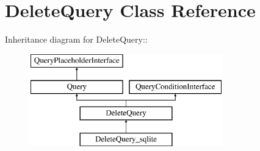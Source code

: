\hypertarget{classDeleteQuery}{
\section{DeleteQuery Class Reference}
\label{classDeleteQuery}
}
Inheritance diagram for DeleteQuery::\begin{figure}[H]
\begin{center}
\leavevmode
\includegraphics[height=4cm]{classDeleteQuery}
\end{center}
\end{figure}
